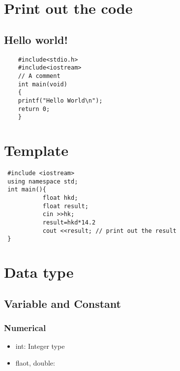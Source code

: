 \documentclass[a4paper]{article}
\begin{document}
\maketitle


\tableofcontents

\section{Print out the code}
\subsection{Hello world!}
\begin{lstlisting}
    #include<stdio.h>
    #include<iostream>
    // A comment
    int main(void)
    {
    printf("Hello World\n");
    return 0;
    }
\end{lstlisting}



\section{Template}
\begin{lstlisting}
 #include <iostream>
 using namespace std;
 int main(){
           float hkd;
           float result;
           cin >>hk;
           result=hkd*14.2
           cout <<result; // print out the result
 }

\end{lstlisting}



\section{Data type}
\subsection{Variable and Constant}

\subsubsection{Numerical}
\begin{itemize}
\item int: Integer type
\item flaot, double: 
\end{itemize}
\end{document}
